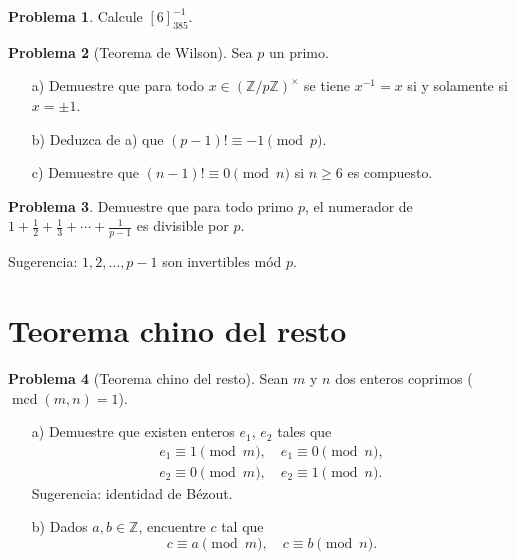 \documentclass{article}
\newcommand{\ZZ}{\mathbb{Z}}
\DeclareMathOperator{\mcd}{mcd}
\theoremstyle{definition}
\newtheorem{problema}{Problema}[section]
\begin{document}
\begin{problema}
  Calcule $[6]_{385}^{-1}$.
\end{problema}

\begin{problema}[Teorema de Wilson]
  \label{probl:Wilson-1}
  Sea $p$ un primo.

  \begin{enumerate}
  \item[a)] Demuestre que para todo $x \in (\ZZ/p\ZZ)^\times$ se tiene
    $x^{-1} = x$ si y solamente si $x = \pm 1$.

  \item[b)] Deduzca de a) que $(p - 1)! \equiv -1 \pmod{p}$.

  \item[c)] Demuestre que $(n-1)! \equiv 0 \pmod{n}$ si $n \ge 6$ es compuesto.
  \end{enumerate}
\end{problema}

\begin{problema}
  Demuestre que para todo primo $p$, el numerador de
  $1 + \frac{1}{2} + \frac{1}{3} + \cdots + \frac{1}{p-1}$
  es divisible por $p$.

  Sugerencia: $1, 2, \ldots, p-1$ son invertibles mód $p$.
\end{problema}


\section{Teorema chino del resto}

\begin{problema}[Teorema chino del resto]
  Sean $m$ y $n$ dos enteros coprimos ($\mcd (m,n) = 1$).

  \begin{itemize}
  \item[a)] Demuestre que existen enteros $e_1$, $e_2$ tales que
    \begin{gather*}
      e_1 \equiv 1 \pmod{m}, \quad e_1 \equiv 0 \pmod{n}, \\
      e_2 \equiv 0 \pmod{m}, \quad e_2 \equiv 1 \pmod{n}.
    \end{gather*}
    Sugerencia: identidad de Bézout.

  \item[b)] Dados $a, b \in \ZZ$, encuentre $c$ tal que
    $$c \equiv a \pmod{m}, \quad c \equiv b \pmod{n}.$$
  \end{itemize}
\end{problema}
\end{document}
